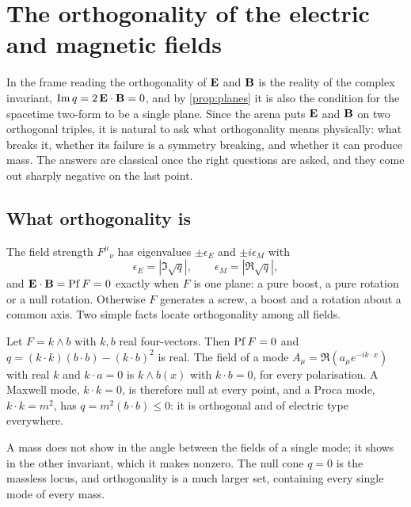 

\section{The orthogonality of the electric and magnetic fields}
\label{sec:orth}

In the frame reading the orthogonality of $\mathbf E$ and $\mathbf B$ is the reality of the complex invariant, $\operatorname{Im} q=2\,\mathbf E\cdot\mathbf B=0$, and
by \cref{prop:planes} it is also the condition for the spacetime two-form to be a single plane. Since the arena puts $\mathbf E$ and $\mathbf B$
on two orthogonal triples, it is natural to ask what orthogonality means physically: what breaks it, whether its failure is a
symmetry breaking, and whether it can produce mass. The answers are classical once the right questions are asked, and they come out
sharply negative on the last point.

\subsection{What orthogonality is}
\label{sec:orth:what}

The field strength $F^\mu{}_\nu$ has eigenvalues $\pm\epsilon_E$ and $\pm i\epsilon_M$ with
\[
\epsilon_E=|\Im\sqrt q|,\qquad \epsilon_M=|\Re\sqrt q|,
\]
and $\mathbf E\cdot\mathbf B=\operatorname{Pf} F=0$ exactly when $F$ is one plane: a pure boost, a pure rotation or a null rotation. Otherwise $F$ generates a
screw, a boost and a rotation about a common axis. Two simple facts locate orthogonality among all fields.

\begin{proposition}
\label{prop:modes}
Let $F=k\wedge b$ with $k,b$ real four-vectors. Then $\operatorname{Pf} F=0$ and $q=(k\cdot k)(b\cdot b)-(k\cdot b)^2$ is real. The field of a mode
$A_\mu=\Re(a_\mu e^{-ik\cdot x})$ with real $k$ and $k\cdot a=0$ is $k\wedge b(x)$ with $k\cdot b=0$, for every polarisation. A Maxwell mode,
$k\cdot k=0$, is therefore null at every point, and a Proca mode, $k\cdot k=m^2$, has $q=m^2(b\cdot b)\le0$: it is orthogonal and of
electric type everywhere.
\end{proposition}

A mass does not show in the angle between the fields of a single mode; it shows in the other invariant, which it makes nonzero.
The null cone $q=0$ is the massless locus, and orthogonality is a much larger set, containing every single mode of every mass.

